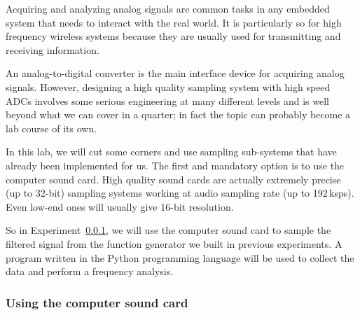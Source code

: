 \documentclass[letterpaper, 11pt]{article}
\begin{document}
Acquiring and analyzing analog signals are common tasks in any embedded system that needs to interact with the real world. It is particularly so for high frequency wireless systems because they are usually used for transmitting and receiving information. 

An analog-to-digital converter is the main interface device for acquiring analog signals. However, designing a high quality sampling system with high speed ADCs involves some serious engineering at many different levels and is well beyond what we can cover in a quarter; in fact the topic can probably become a lab course of its own. 

In this lab, we will cut some corners and use sampling sub-systems that have already been implemented for us. The first and mandatory option is to use the computer sound card. High quality sound cards are actually extremely precise (up to 32-bit) sampling systems working at audio sampling rate (up to 192\,ksps). Even low-end ones will usually give 16-bit resolution.

So in Experiment~\ref{sec:soundcard}, we will use the computer sound card to sample the filtered signal from the function generator we built in previous experiments. A program written in the Python programming language will be used to collect the data and perform a frequency analysis. 

\subsubsection{Using the computer sound card}
\label{sec:soundcard}
\end{document}
